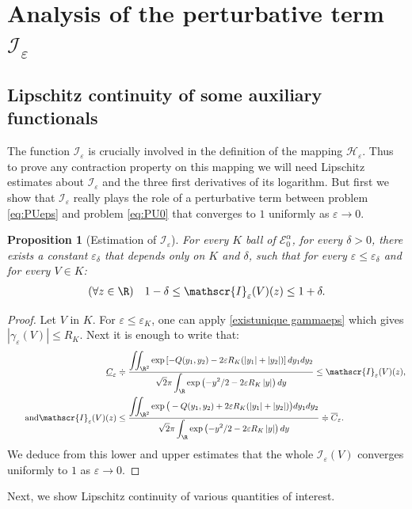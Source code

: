 \documentclass[10pt]{amsart}
\let\mathcal\mathscr
\newcommand{\cI}{\mathcal{I}}
\theoremstyle{plain}
\newtheorem{prop}[thm]{Proposition}
\theoremstyle{definition}
\renewcommand{\H}{\mathcal{H}_\eps}
\let\eps\varepsilon
\let\ds\displaystyle
\newcommand{\abs}[1]{\left\lvert#1\right\rvert}
\newcommand{\Eaz}{\mathcal{E}^\alpha_0}
\newcommand{\RK}{R_K}
\begin{document}
\section{Analysis of the perturbative term \texorpdfstring{$\cI_\eps$}{Ie}}\label{sec prop Ieps}
\subsection{Lipschitz continuity of some auxiliary functionals}\label{sec reg prop Ieps}\label{sec regprop Ieps}
The function $\cI_\eps$ is crucially involved in the definition of the mapping $\H$. Thus to prove any contraction property on this mapping we will need Lipschitz estimates about $\cI_\eps$ and the three first derivatives of its logarithm. But first we show that $\cI_\eps$ really plays the role of a perturbative term between problem \eqref{eq:PUeps} and problem \eqref{eq:PU0} that converges to $1$ uniformly as $\eps\to0$.

\begin{prop}[Estimation of $\cI_\eps$]\label{estim Ieps}
For every $K$ ball of $\Eaz$, for every $\delta>0$, there exists a constant $\eps_\delta$ that depends only on $K$ and $\delta$, such that for every $\eps \leq \eps_\delta$ and for every $V \in K$:
\begin{align*}
(\forall z\in \R)\quad 1-\delta \leq \cI_\eps(V)(z) \leq 1+\delta.
\end{align*}
\end{prop}
\begin{proof}
Let $V$ in $K$. For $\eps\leq\eps_K$, one can apply \cref{existunique gammaeps} which gives \hbox{$\abs{\gamma_\eps(V)}\leq\RK$}. Next it is enough to write that:
\begin{align*}
\underline{C}_\eps &\doteqdot \dfrac{\ds \iint_{\R^2} \exp\left[-Q(y_1,y_2) - 2 \eps R_K (\abs{y_1}+\abs{y_2}) \right]d y_1 d y_2 }{\ds\sqrt{2 } \pi \int_\R \exp\left(- y^2/2 - 2 \eps R_K \abs{y} \right) d y} \leq \cI_\eps(V)(z),\\
\tag*{and}
\cI_\eps(V)(z) &\leq \dfrac{\ds \iint_{\R^2} \exp\big(-Q(y_1,y_2) + 2 \eps R_K(\abs{y_1}+\abs{y_2}) 	 \big)d y_1 d y_2 }{\ds\sqrt{2 } \pi \int_\R \exp\left(- y^2/2 - 2 \eps R_K \abs{y} \right) d y} \doteqdot \overline{C}_\eps.
\end{align*}
We deduce from this lower and upper estimates that the whole $\cI_\eps(V)$ converges uniformly to $1$ as $\eps \to 0$.
\end{proof}

Next, we show Lipschitz continuity of various quantities of interest.
\end{document}
